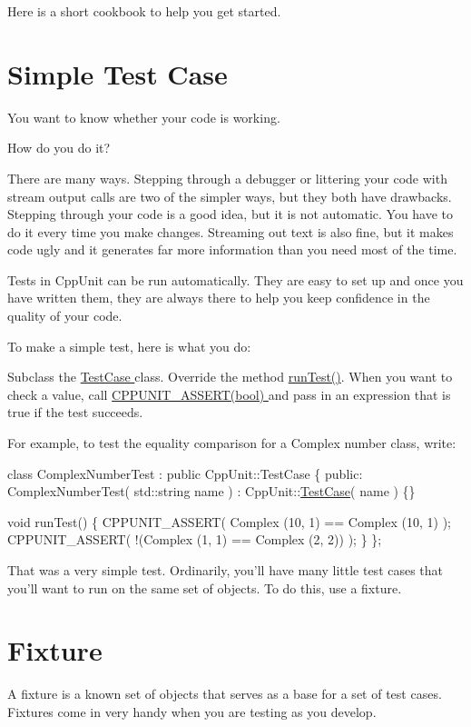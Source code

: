 Here is a short cookbook to help you get started.\hypertarget{cppunit_cookbook_simple_test_case}{}\section{Simple Test Case}\label{cppunit_cookbook_simple_test_case}
You want to know whether your code is working.

How do you do it?

There are many ways. Stepping through a debugger or littering your code with stream output calls are two of the simpler ways, but they both have drawbacks. Stepping through your code is a good idea, but it is not automatic. You have to do it every time you make changes. Streaming out text is also fine, but it makes code ugly and it generates far more information than you need most of the time.

Tests in Cpp\+Unit can be run automatically. They are easy to set up and once you have written them, they are always there to help you keep confidence in the quality of your code.

To make a simple test, here is what you do\+:

Subclass the \hyperlink{}{Test\+Case } class. Override the method \hyperlink{}{run\+Test()}. When you want to check a value, call \hyperlink{}{C\+P\+P\+U\+N\+I\+T\+\_\+\+A\+S\+S\+E\+R\+T(bool) } and pass in an expression that is true if the test succeeds.

For example, to test the equality comparison for a Complex number class, write\+:


\begin{DoxyCode}
\textcolor{keyword}{class }ComplexNumberTest : \textcolor{keyword}{public} CppUnit::TestCase \{ 
\textcolor{keyword}{public}: 
  ComplexNumberTest( std::string name ) : CppUnit::\hyperlink{class_test_case}{TestCase}( name ) \{\}
  
  \textcolor{keywordtype}{void} runTest() \{
    CPPUNIT\_ASSERT( Complex (10, 1) == Complex (10, 1) );
    CPPUNIT\_ASSERT( !(Complex (1, 1) == Complex (2, 2)) );
  \}
\};
\end{DoxyCode}


That was a very simple test. Ordinarily, you'll have many little test cases that you'll want to run on the same set of objects. To do this, use a fixture.\hypertarget{cppunit_cookbook_fixture}{}\section{Fixture}\label{cppunit_cookbook_fixture}
A fixture is a known set of objects that serves as a base for a set of test cases. Fixtures come in very handy when you are testing as you develop.

